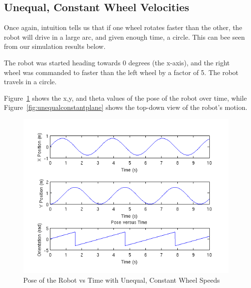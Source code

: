 \documentclass[10pt]{article}
\begin{document}
\newpage
\subsection{Unequal, Constant Wheel Velocities}
Once again, intuition tells us that if one wheel rotates faster than the other, the robot will drive in a large arc, and given enough time, a circle.  This can bee seen from our simulation results below.

The robot was started heading towards 0 degrees (the x-axis), and the right wheel was commanded to faster than the left wheel by a factor of 5.  The robot travels in a circle.

Figure~\ref{fig:unequalconstantpose} shows the x,y, and theta values of the pose of the robot over time, while Figure~\ref{fig:unequalconstantplane} shows the top-down view of the robot's motion.

\begin{figure}[h]
 \centering
 \includegraphics[scale=0.55,keepaspectratio=true]{unequalconstantpose.png}
 \caption{Pose of the Robot vs Time with Unequal, Constant Wheel Speeds}
 \label{fig:unequalconstantpose}
\end{figure}
\end{document}
